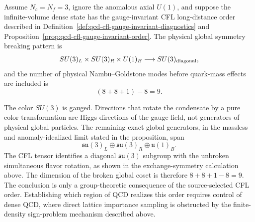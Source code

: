 \begin{remark}
\label{rem:qcd-cfl-goldstone-count}
Assume \(N_c=N_f=3\), ignore the anomalous axial \(U(1)\), and suppose the
infinite-volume dense state has the gauge-invariant CFL long-distance order
described in
Definition~\ref{def:qcd-cfl-gauge-invariant-diagnostics} and
Proposition~\ref{prop:qcd-cfl-gauge-invariant-order}.  The physical global
symmetry breaking pattern is
\[
  SU(3)_L\times SU(3)_R\times U(1)_B
  \longrightarrow
  SU(3)_{\rm diagonal},
\]
and the number of physical Nambu--Goldstone modes before quark-mass effects
are included is
\[
  (8+8+1)-8=9.
\]

The color \(SU(3)\) is gauged.  Directions that rotate the condensate by a
pure color transformation are Higgs directions of the gauge field, not
generators of physical global particles.  The remaining exact global
generators, in the massless and anomaly-idealized limit stated in the
proposition, span
\[
  \mathfrak{su}(3)_L\oplus\mathfrak{su}(3)_R\oplus\mathfrak u(1)_B .
\]
The CFL tensor identifies a diagonal \(\mathfrak{su}(3)\) subgroup with the
unbroken simultaneous flavor rotation, as shown in the exchange-symmetry
calculation above.  The dimension of the broken global coset is therefore
\(8+8+1-8=9\).  The conclusion is only a group-theoretic consequence of the
source-selected CFL order.  Establishing which region of QCD realizes this
order requires control of dense QCD, where direct lattice importance sampling
is obstructed by the finite-density sign-problem mechanism described above.
\end{remark}

